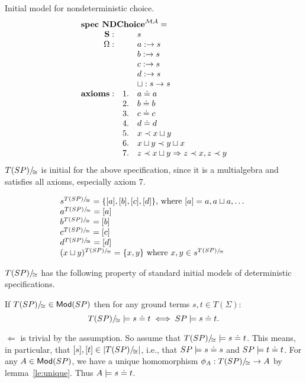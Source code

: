 \documentclass[10pt]{article}
\begin{document}
\begin{example}
Initial model for nondeterministic choice.
\[ \spec{
	\tit{\mbox{\bf spec\ NDChoice}^{\inst{MA}}=} \\
		\Sorts: && s\\
		\Ops:   && a: \to s\\
			&& b:\to s\\
			&& c: \to s\\
			&& d:\to s\\
			&& \choice:s \to s\\
		{\bf axioms:}
			&1.& a \eleq a\\
			&2.& b \eleq b\\			
		        &3.& c \eleq c\\
			&4.& d \eleq d\\
			&5.& x \prec x \choice y \\
			&6.& x \choice y \prec y \choice x\\
			&7.& z \prec x \choice y \To z \prec x , z \prec y \\	
}
\]
$T(SP)/\!_{\cong}$ is initial for the above specification, since it is a
multialgebra and satisfies all axioms, especially axiom 7.

	\[ \begin{array}{l}
		s^{T(SP)/\!_{\cong}} =\{ [a], [b], [c], [d] \}\mbox{, where $[a] = a, a \sqcup a, \ldots$ }\\
		a^{T(SP)/\!_{\cong}} =[a] \\
		b^{T(SP)/\!_{\cong}} =[b] \\
		c^{T(SP)/\!_{\cong}} =[c] \\
		d^{T(SP)/\!_{\cong}} =[d] \\
		(x\sqcup y)^{T(SP)/\!_{\cong}} = \{ x,y \} \mbox{ where $x,y \in s^{T(SP)/\!_{\cong}}$}  \\
	\end{array} \]
\end{example}
$T(SP)/\!_{\cong}$ has the following property of standard initial models of
deterministic specifications.
\begin{proposition}\label{prop:geq}
If $T(SP)/\!_{\cong}\in{\sf {Mod}}(SP)$ then for any ground terms $s,t\in
T(\Sigma):$ \[ T(SP)/\!_{\cong}\models s\mathrel{\dot{=} } t \iff SP\models s\mathrel{\dot{=} } t. \]
\end{proposition}
\begin{PROOF}
$\Leftarrow$ is trivial by the assumption. So assume that
$T(SP)/\!_{\cong}\models s\mathrel{\dot{=} } t$. This means, in particular, that
$[s],[t]\in |T(SP)/\!_{\cong}|$, i.e., that $SP\models
s\mathrel{\dot{=} } s$ and $SP\models t\mathrel{\dot{=} } t$. For any $A\in{\sf {Mod}}(SP)$, we have a unique
homomorphism $\phi_A:T(SP)/\!_{\cong}\to A$ by lemma~\ref{le:unique}. Thus
$A\models s\mathrel{\dot{=} } t$.
\end{PROOF}
%
\end{document}
